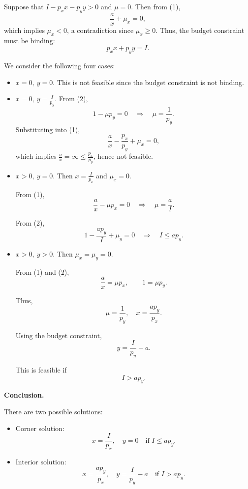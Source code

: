 \medskip

Suppose that $I - p_x x - p_y y > 0$ and $\mu = 0$.
Then from (1),
\[
\frac{a}{x} + \mu_x = 0,
\]
which implies $\mu_x < 0$, a contradiction since $\mu_x \ge 0$.
Thus, the budget constraint must be binding:
\[
p_x x + p_y y = I.
\]

\medskip

We consider the following four cases:

\begin{itemize}
    \item[(i)] $x=0,\ y=0$.  
    This is not feasible since the budget constraint is not binding.

    \item[(ii)] $x=0,\ y=\frac{I}{p_y}$.  
    From (2),
    \[
    1 - \mu p_y = 0 \quad \Rightarrow \quad \mu = \frac{1}{p_y}.
    \]
    Substituting into (1),
    \[
    \frac{a}{x} - \frac{p_x}{p_y} + \mu_x = 0,
    \]
    which implies $\frac{a}{x} = \infty \le \frac{p_x}{p_y}$, hence not feasible.

    \item[(iii)] $x>0,\ y=0$.  
    Then $x=\frac{I}{p_x}$ and $\mu_x=0$.

    From (1),
    \[
    \frac{a}{x} - \mu p_x = 0
    \quad \Rightarrow \quad
    \mu = \frac{a}{I}.
    \]

    From (2),
    \[
    1 - \frac{ap_y}{I} + \mu_y = 0
    \quad \Rightarrow \quad
    I \le a p_y.
    \]

    \item[(iv)] $x>0,\ y>0$.  
    Then $\mu_x = \mu_y = 0$.

    From (1) and (2),
    \[
    \frac{a}{x} = \mu p_x, \qquad 1 = \mu p_y.
    \]

    Thus,
    \[
    \mu = \frac{1}{p_y},
    \quad
    x = \frac{a p_y}{p_x}.
    \]

    Using the budget constraint,
    \[
    y = \frac{I}{p_y} - a.
    \]

    This is feasible if
    \[
    I > a p_y.
    \]
\end{itemize}

\medskip

\textbf{Conclusion.}

There are two possible solutions:

\begin{itemize}
    \item[(i)] Corner solution:
    \[
    x = \frac{I}{p_x}, \quad y = 0
    \quad \text{if } I \le a p_y.
    \]

    \item[(ii)] Interior solution:
    \[
    x = \frac{a p_y}{p_x}, \quad y = \frac{I}{p_y} - a
    \quad \text{if } I > a p_y.
    \]
\end{itemize}

